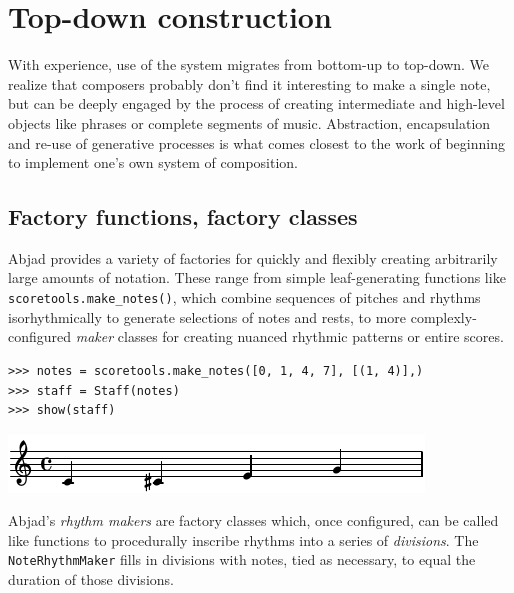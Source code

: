 \documentclass{article}
\begin{document}
\section{Top-down construction} \label{sec:top-down}

With experience, use of the system migrates from bottom-up to top-down. We
realize that composers probably don't find it interesting to make a single
note, but can be deeply engaged by the process of creating intermediate and
high-level objects like phrases or complete segments of music. Abstraction,
encapsulation and re-use of generative processes is what comes closest to the
work of beginning to implement one's own system of composition.

\subsection{Factory functions, factory classes}

Abjad provides a variety of factories for quickly and flexibly creating
arbitrarily large amounts of notation. These range from simple leaf-generating
functions like \texttt{scoretools.make\_notes()}, which combine sequences of
pitches and rhythms isorhythmically to generate selections of notes and rests,
to more complexly-configured \emph{maker} classes for creating nuanced rhythmic
patterns or entire scores.

\begin{lstlisting}
>>> notes = scoretools.make_notes([0, 1, 4, 7], [(1, 4)],)
>>> staff = Staff(notes)
>>> show(staff)
\end{lstlisting}
\includegraphics{assets/lilypond-64155bcaa384109d40ae2616a2224dd1.pdf}

Abjad's \emph{rhythm makers} are factory classes which, once configured, can be
called like functions to procedurally inscribe rhythms into a series of
\emph{divisions}. The \texttt{NoteRhythmMaker} fills in divisions with notes,
tied as necessary, to equal the duration of those divisions.
\end{document}
